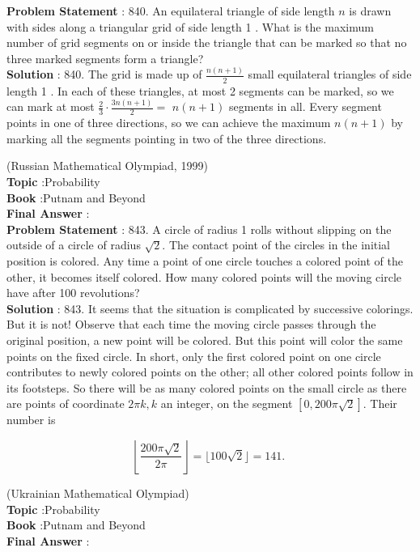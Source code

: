 \documentclass[10pt]{article}
\begin{document}
\textbf{Problem Statement} :
840. An equilateral triangle of side length $n$ is drawn with sides along a triangular grid of side length 1 . What is the maximum number of grid segments on or inside the triangle that can be marked so that no three marked segments form a triangle?
\\
\textbf{Solution} :
840. The grid is made up of $\frac{n(n+1)}{2}$ small equilateral triangles of side length 1 . In each of these triangles, at most 2 segments can be marked, so we can mark at most $\frac{2}{3} \cdot \frac{3 n(n+1)}{2}=$ $n(n+1)$ segments in all. Every segment points in one of three directions, so we can achieve the maximum $n(n+1)$ by marking all the segments pointing in two of the three directions.

(Russian Mathematical Olympiad, 1999)
\\
\textbf{Topic} :Probability\\
\textbf{Book} :Putnam and Beyond\\
\textbf{Final Answer} :\\


\textbf{Problem Statement} :
843. A circle of radius 1 rolls without slipping on the outside of a circle of radius $\sqrt{2}$. The contact point of the circles in the initial position is colored. Any time a point of one circle touches a colored point of the other, it becomes itself colored. How many colored points will the moving circle have after 100 revolutions?
\\
\textbf{Solution} :
843. It seems that the situation is complicated by successive colorings. But it is not! Observe that each time the moving circle passes through the original position, a new point will be colored. But this point will color the same points on the fixed circle. In short, only the first colored point on one circle contributes to newly colored points on the other; all other colored points follow in its footsteps. So there will be as many colored points on the small circle as there are points of coordinate $2 \pi k, k$ an integer, on the segment $[0,200 \pi \sqrt{2}]$. Their number is 

$$
\left\lfloor\frac{200 \pi \sqrt{2}}{2 \pi}\right\rfloor=\lfloor 100 \sqrt{2}\rfloor=141 \text {. }
$$

(Ukrainian Mathematical Olympiad)
\\
\textbf{Topic} :Probability\\
\textbf{Book} :Putnam and Beyond\\
\textbf{Final Answer} :\\
\end{document}
